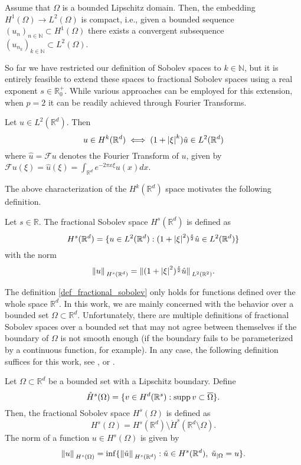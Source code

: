 \begin{theorem}\label{rellich}
    Assume that \(\Omega\) is a bounded Lipschitz domain. Then, the embedding \(H^1(\Omega) \rightarrow L^2(\Omega)\) is compact, i.e., given a bounded sequence \((u_n)_{n \in \mathbb{N}} \subset H^1(\Omega)\) there exists a convergent subsequence \((u_{n_k})_{k \in \mathbb{N}} \subset L^2(\Omega)\).
\end{theorem}

So far we have restricted our definition of Sobolev spaces to \(k \in \mathbb{N}\), but it is entirely feasible to extend these spaces to fractional Sobolev spaces using a real exponent \(s \in \mathbb{R}_0^+\). While various approaches can be employed for this extension, when \(p=2\) it can be readily achieved through Fourier Transforms.

\begin{lemma}
    Let \(u \in L^2(\mathbb{R}^d)\). Then
    \[
    u \in H^k(\mathbb{R}^d) \iff (1+ \abs{\xi}^k)\hat{u} \in L^2(\mathbb{R}^d)
    \]
    where \(\hat{u} = \mathcal{F}u\) denotes the Fourier Transform of \(u\), given by \(\mathcal{F}u(\xi) = \hat{u}(\xi) = \int_{\mathbb{R}^d} e^{-2 \pi x \xi} u(x) dx\).
\end{lemma}

The above characterization of the \(H^k(\mathbb{R}^d)\) space motivates the following definition.

\begin{definition}\label{def_fractional_sobolev}
    Let \(s \in \mathbb{R}\). The fractional Sobolev space \(H^s(\mathbb{R}^d)\) is defined as
    \[
    H^s(\mathbb{R}^d) = \{u \in L^2(\mathbb{R}^d): (1+ \abs{\xi}^2)^\frac{s}{2}\hat{u} \in L^2(\mathbb{R}^d)\} 
    \]
    with the norm
    \[
        \norm*{u}_{H^s(\mathbb{R}^d)} = \norm*{(1+ \abs{\xi}^2)^\frac{s}{2} \hat{u}}_{L^2(\mathbb{R}^2)}.
    \]
\end{definition}
The definition \ref{def_fractional_sobolev} only holds for functions defined over the whole space \(\mathbb{R}^d\). In this work, we are mainly concerned with the behavior over a bounded set \(\Omega \subset \mathbb{R}^d\). Unfortunately, there are multiple definitions of fractional Sobolev spaces over a bounded set that may not agree between themselves if the boundary of \(\Omega\) is not smooth enough (if the boundary fails to be parameterized by a continuous function, for example). In any case, the following definition suffices for this work, see \cite{bogomolny1985fundamental}, \cite{chandler2017sobolev} or \cite{hewett2017note}.  
\begin{definition}
    Let \(\Omega \subset \mathbb{R}^d\) be a bounded set with a Lipschitz boundary. Define
    \[
        \mathring{H}^s(\Omega) = \{v \in H^d(\mathbb{R}^s): \operatorname{supp} v \subset \overline{\Omega}\}.
    \]
    Then, the fractional Sobolev space \(H^s(\Omega)\) is defined as
    \[
        H^s(\Omega) = H^s(\mathbb{R}^d)\setminus \mathring{H}^s(\mathbb{R}^d\setminus\Omega).
    \]
    The norm of a function \(u \in H^s(\Omega)\) is given by
    \[
        \norm*{u}_{H^s(\Omega)} = \inf \{\norm*{\Tilde{u}}_{H^s(\mathbb{R}^d)}: \Tilde{u} \in H^s(\mathbb{R}^d), \; \Tilde{u}_{|\Omega} = u\}.
    \]
\end{definition}

